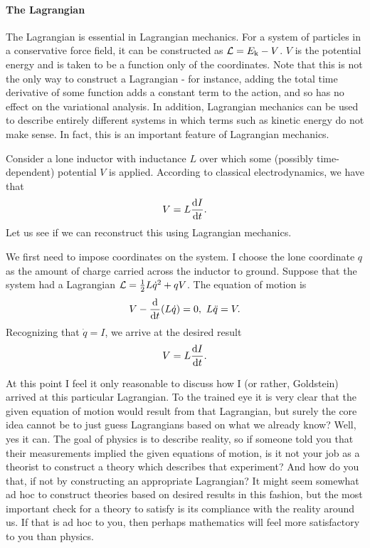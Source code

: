 \paragraph{The Lagrangian}
The Lagrangian is essential in Lagrangian mechanics. For a system of particles in a conservative force field, it can be constructed as $\mathcal{L} = E_{\text{k}} - V$. $V$ is the potential energy and is taken to be a function only of the coordinates. Note that this is not the only way to construct a Lagrangian - for instance, adding the total time derivative of some function adds a constant term to the action, and so has no effect on the variational analysis. In addition, Lagrangian mechanics can be used to describe entirely different systems in which terms such as kinetic energy do not make sense. In fact, this is an important feature of Lagrangian mechanics.

Consider a lone inductor with inductance $L$ over which some (possibly time-dependent) potential $V$ is applied. According to classical electrodynamics, we have that
\begin{align*}
	V = L\dv{I}{t}.
\end{align*}
Let us see if we can reconstruct this using Lagrangian mechanics.

We first need to impose coordinates on the system. I choose the lone coordinate $q$ as the amount of charge carried across the inductor to ground. Suppose that the system had a Lagrangian $\mathcal{L} = \frac{1}{2}L\dot{q}^{2} + qV$. The equation of motion is
\begin{align*}
	V - \dv{t}(L\dot{q}) = 0,\ L\ddot{q} = V.
\end{align*}
Recognizing that $\dot{q} = I$, we arrive at the desired result
\begin{align*}
	V = L\dv{I}{t}.
\end{align*}

At this point I feel it only reasonable to discuss how I (or rather, Goldstein) arrived at this particular Lagrangian. To the trained eye it is very clear that the given equation of motion would result from that Lagrangian, but surely the core idea cannot be to just guess Lagrangians based on what we already know? Well, yes it can. The goal of physics is to describe reality, so if someone told you that their measurements implied the given equations of motion, is it not your job as a theorist to construct a theory which describes that experiment? And how do you that, if not by constructing an appropriate Lagrangian? It might seem somewhat ad hoc to construct theories based on desired results in this fashion, but the most important check for a theory to satisfy is its compliance with the reality around us. If that is ad hoc to you, then perhaps mathematics will feel more satisfactory to you than physics.

